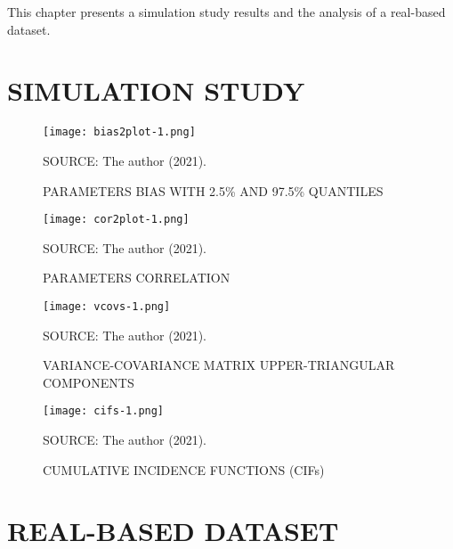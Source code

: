 This chapter presents a simulation study results and the analysis of a
real-based dataset.

\section{SIMULATION STUDY}
\label{cap:simures}

\begin{figure}[H]
 \setlength{\abovecaptionskip}{.0001pt}
 \caption{PARAMETERS BIAS WITH 2.5\% AND 97.5\% QUANTILES}
 \vspace{0.2cm}\centering
 \texttt{[image: bias2plot-1.png]}\\
 \begin{footnotesize}
  SOURCE: The author (2021).
 \end{footnotesize}
 \label{fig:bias2plot}
\end{figure}

\begin{figure}[H]
 \setlength{\abovecaptionskip}{.0001pt}
 \caption{PARAMETERS CORRELATION}
 \vspace{0.2cm}\centering
 \texttt{[image: cor2plot-1.png]}\\
 \begin{footnotesize}
  SOURCE: The author (2021).
 \end{footnotesize}
 \label{fig:cor2plot}
\end{figure}

\begin{figure}[H]
 \setlength{\abovecaptionskip}{.0001pt}
 \caption{VARIANCE-COVARIANCE MATRIX UPPER-TRIANGULAR COMPONENTS}
 \vspace{0.2cm}\centering
 \texttt{[image: vcovs-1.png]}\\
 \begin{footnotesize}
  SOURCE: The author (2021).
 \end{footnotesize}
 \label{fig:vcovs}
\end{figure}

\begin{figure}[H]
 \setlength{\abovecaptionskip}{.0001pt}
 \caption{CUMULATIVE INCIDENCE FUNCTIONS (CIFs)}
 \vspace{0.2cm}\centering
 \texttt{[image: cifs-1.png]}\\
 \begin{footnotesize}
  SOURCE: The author (2021).
 \end{footnotesize}
 \label{fig:cifs}
\end{figure}

\section{REAL-BASED DATASET}
\label{cap:datares}

